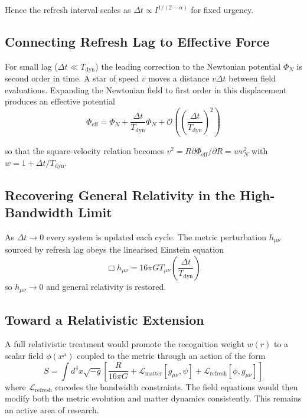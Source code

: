 \documentclass[twocolumn,prd,amsmath,amssymb,aps,superscriptaddress,nofootinbib]{revtex4-2}
\begin{document}
Hence the refresh interval scales as $\Delta t \propto I^{1/(2-\alpha)}$ for fixed urgency.

\subsection{Connecting Refresh Lag to Effective Force}

For small lag ($\Delta t \ll T_{\text{dyn}}$) the leading correction to the Newtonian potential $\Phi_N$ is second order in time. A star of speed $v$ moves a distance $v\Delta t$ between field evaluations. Expanding the Newtonian field to first order in this displacement produces an effective potential
\begin{equation}
\Phi_{\text{eff}} = \Phi_N + \frac{\Delta t}{T_{\text{dyn}}} \Phi_N + \mathcal{O}\left(\left(\frac{\Delta t}{T_{\text{dyn}}}\right)^2\right)
\end{equation}

so that the square-velocity relation becomes $v^2 = R \partial\Phi_{\text{eff}}/\partial R = w v_N^2$ with $w = 1 + \Delta t/T_{\text{dyn}}$.

\subsection{Recovering General Relativity in the High-Bandwidth Limit}

As $\Delta t \to 0$ every system is updated each cycle. The metric perturbation $h_{\mu\nu}$ sourced by refresh lag obeys the linearised Einstein equation
\begin{equation}
\Box h_{\mu\nu} = 16\pi G T_{\mu\nu} \left(\frac{\Delta t}{T_{\text{dyn}}}\right)
\end{equation}
so $h_{\mu\nu} \to 0$ and general relativity is restored.

\subsection{Toward a Relativistic Extension}

A full relativistic treatment would promote the recognition weight $w(r)$ to a scalar field $\phi(x^\mu)$ coupled to the metric through an action of the form
\begin{equation}
S = \int d^4x \sqrt{-g} \left[ \frac{R}{16\pi G} + \mathcal{L}_{\text{matter}}[g_{\mu\nu}, \psi] + \mathcal{L}_{\text{refresh}}[\phi, g_{\mu\nu}] \right]
\end{equation}
where $\mathcal{L}_{\text{refresh}}$ encodes the bandwidth constraints. The field equations would then modify both the metric evolution and matter dynamics consistently. This remains an active area of research.
\end{document}
